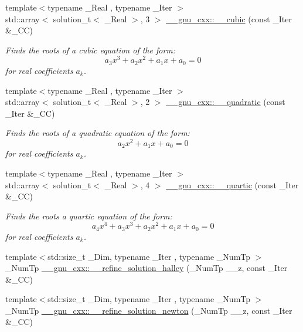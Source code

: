 \begin{DoxyCompactItemize}
\item 
{\footnotesize template$<$typename \+\_\+\+Real , typename \+\_\+\+Iter $>$ }\\std\+::array$<$ solution\+\_\+t$<$ \+\_\+\+Real $>$, 3 $>$ \hyperlink{namespace____gnu__cxx_a422f638b186be2071012321de5f9bb48}{\+\_\+\+\_\+gnu\+\_\+cxx\+::\+\_\+\+\_\+cubic} (const \+\_\+\+Iter \&\+\_\+\+CC)
\begin{DoxyCompactList}\small\item\em Finds the roots of a cubic equation of the form\+: \[ a_3 x^3 + a_2 x^2 + a_1 x + a_0 = 0 \] for real coefficients $ a_k $. \end{DoxyCompactList}\item 
{\footnotesize template$<$typename \+\_\+\+Real , typename \+\_\+\+Iter $>$ }\\std\+::array$<$ solution\+\_\+t$<$ \+\_\+\+Real $>$, 2 $>$ \hyperlink{namespace____gnu__cxx_aa8c3d98e6508a1e20a17c5980ccbbd99}{\+\_\+\+\_\+gnu\+\_\+cxx\+::\+\_\+\+\_\+quadratic} (const \+\_\+\+Iter \&\+\_\+\+CC)
\begin{DoxyCompactList}\small\item\em Finds the roots of a quadratic equation of the form\+: \[ a_2 x^2 + a_1 x + a_0 = 0 \] for real coefficients $ a_k $. \end{DoxyCompactList}\item 
{\footnotesize template$<$typename \+\_\+\+Real , typename \+\_\+\+Iter $>$ }\\std\+::array$<$ solution\+\_\+t$<$ \+\_\+\+Real $>$, 4 $>$ \hyperlink{namespace____gnu__cxx_ac813fbad739bf1d431845d5175f24701}{\+\_\+\+\_\+gnu\+\_\+cxx\+::\+\_\+\+\_\+quartic} (const \+\_\+\+Iter \&\+\_\+\+CC)
\begin{DoxyCompactList}\small\item\em Finds the roots a quartic equation of the form\+: \[ a_4 x^4 + a_3 x^3 + a_2 x^2 + a_1 x + a_0 = 0 \] for real coefficients $ a_k $. \end{DoxyCompactList}\item 
{\footnotesize template$<$std\+::size\+\_\+t \+\_\+\+Dim, typename \+\_\+\+Iter , typename \+\_\+\+Num\+Tp $>$ }\\\+\_\+\+Num\+Tp \hyperlink{namespace____gnu__cxx_a957b92036746a66f3dff0c46cb18120b}{\+\_\+\+\_\+gnu\+\_\+cxx\+::\+\_\+\+\_\+refine\+\_\+solution\+\_\+halley} (\+\_\+\+Num\+Tp \+\_\+\+\_\+z, const \+\_\+\+Iter \&\+\_\+\+CC)
\item 
{\footnotesize template$<$std\+::size\+\_\+t \+\_\+\+Dim, typename \+\_\+\+Iter , typename \+\_\+\+Num\+Tp $>$ }\\\+\_\+\+Num\+Tp \hyperlink{namespace____gnu__cxx_a2b802e73df33cafb7f95800cbca6ff30}{\+\_\+\+\_\+gnu\+\_\+cxx\+::\+\_\+\+\_\+refine\+\_\+solution\+\_\+newton} (\+\_\+\+Num\+Tp \+\_\+\+\_\+z, const \+\_\+\+Iter \&\+\_\+\+CC)

\end{DoxyCompactItemize}
